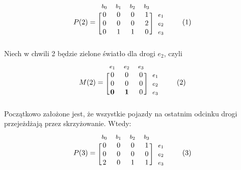 \documentclass[12pt]{book}
\theoremstyle{plain}
\newcommand\addtag{\refstepcounter{equation}
\renewcommand{\labelenumii}{\theenumii}
\renewcommand{\theenumii}{\theenumi.\arabic{enumii}.}
\tag{\theequation}}
\begin{document}
\begin{equation*}
  P(2)=
  \begin{blockarray}{*{4}{c} l}
    \begin{block}{*{4}{>{$\footnotesize}c<{$}} l}
      $b_0$ & $b_1$ & $b_2$ & $b_3$ \\
    \end{block}
    \begin{block}{[*{4}{c}]>{$\footnotesize}l<{$}}
       0 & 0 & 0 & 1 & $e_1$ \\
       0 & 0 & 0 & 2 & $e_2$ \\
       0 & 1 & 1 & 0 & $e_3$ \\
    \end{block}
  \end{blockarray} \addtag \label{skrz_1_zmiennaStanu_0_sygnalizacja}
\end{equation*}
Niech w chwili 2 będzie zielone światło dla drogi $e_2$, czyli
\begin{equation*}
  M(2)=
  \begin{blockarray}{*{3}{c} l}
    \begin{block}{*{3}{>{$\footnotesize}c<{$}} l}
     $e_1$ & $e_2$ & $e_3$\\
    \end{block}
    \begin{block}{[*{3}{c}]>{$\footnotesize}l<{$}}
       0 & 0 & 0 & $e_1$ \\
       0 & 0 & 0 & $e_2$ \\
       \textbf{0} & \textbf{1} & 0 & $e_3$ \\
    \end{block}
  \end{blockarray} \addtag
\end{equation*}
Początkowo założone jest, że wszystkie pojazdy na ostatnim odcinku drogi przejeżdżają przez skrzyżowanie. Wtedy:
\begin{equation*}
  P(3)=
  \begin{blockarray}{*{4}{c} l}
    \begin{block}{*{4}{>{$\footnotesize}c<{$}} l}
      $b_0$ & $b_1$ & $b_2$ & $b_3$ \\
    \end{block}
    \begin{block}{[*{4}{c}]>{$\footnotesize}l<{$}}
       0 & 0 & 0 & 1 & $e_1$ \\
       0 & 0 & 0 & 0 & $e_2$ \\
       2 & 0 & 1 & 1 & $e_3$ \\
    \end{block}
  \end{blockarray} \addtag \label{skrz_1_zmiennaStanu_0_sygnalizacja}
\end{equation*}
\end{document}
